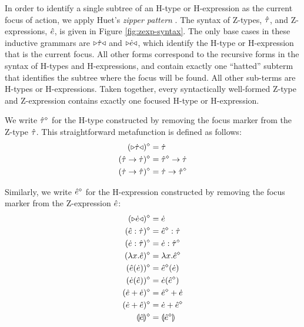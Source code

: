 \documentclass{llncs}
\begin{document}
In order to identify a single subtree of an H-type or H-expression as the current focus of action, we apply Huet's \emph{zipper pattern} \cite{JFP::Huet1997}. The syntax of Z-types, $\hat{\tau}$, and Z-expressions, $\hat{e}$, is given in Figure \ref{fig:zexp-syntax}. The only base cases in these inductive grammars are ${\triangleright}{\dot{\tau}}{\triangleleft}$ and ${\triangleright}{\dot{e}}{\triangleleft}$, which identify the H-type or H-expression that is the current focus. All other forms correspond to the recursive forms in the syntax of H-types and H-expressions, and contain exactly one ``hatted'' subterm that identifies the subtree where the focus will be found. All other sub-terms are H-types or H-expressions. Taken together, every syntactically well-formed Z-type and Z-expression contains exactly one focused H-type or H-expression.

We write $\hat{\tau}^{\diamond}$ for the H-type constructed by removing the focus marker from the Z-type $\hat{\tau}$. This straightforward metafunction is defined as follows:
\begin{align*}
({\triangleright}{\dot{\tau}}{\triangleleft})^{\diamond} & = \dot{\tau}\\
(\hat{\tau} \rightarrow \dot{\tau})^{\diamond} & = \hat{\tau}^{\diamond} \rightarrow \dot{\tau}\\
(\dot{\tau} \rightarrow \hat{\tau})^{\diamond} & = \dot{\tau} \rightarrow \hat{\tau}^{\diamond}
\end{align*}

Similarly, we write $\hat{e}^{\diamond}$ for the H-expression constructed by removing the focus marker from the Z-expression $\hat{e}$:
\begin{align*}
({\triangleright}{\dot{e}}{\triangleleft})^{\diamond} & = \dot{e}\\
(\hat{e} : \dot{\tau})^{\diamond} & = \hat{e}^{\diamond} : \dot{\tau}\\
(\dot{e} : \hat{\tau})^{\diamond} & = \dot{e} : \hat{\tau}^{\diamond}\\
(\lambda x.\hat{e})^{\diamond} & = \lambda x.\hat{e}^{\diamond}\\
(\hat{e}(\dot{e}))^{\diamond} & = \hat{e}^{\diamond}(\dot{e})\\
(\dot{e}(\hat{e}))^{\diamond} & = \dot{e}(\hat{e}^{\diamond})\\
(\hat{e} + \dot{e})^{\diamond} & = \hat{e}^{\diamond} + \dot{e}\\
(\dot{e} + \hat{e})^{\diamond} & = \dot{e} + \hat{e}^{\diamond}\\
\llparenthesis\hat{e}\rrparenthesis^{\diamond} &= \llparenthesis\hat{e}^{\diamond}\rrparenthesis
\end{align*}
\end{document}
